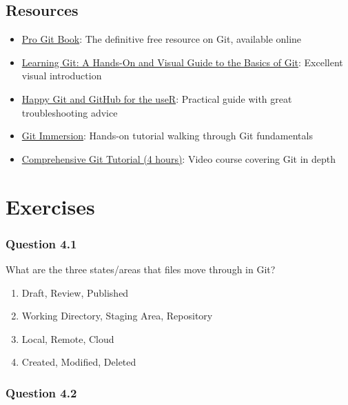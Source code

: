 \documentclass[
  letterpaper,
  DIV=11,
  numbers=noendperiod]{scrreprt}
\providecommand{\tightlist}{%
  \setlength{\itemsep}{0pt}\setlength{\parskip}{0pt}}
\begin{document}
\section{Resources}\label{resources}

\begin{itemize}
\tightlist
\item
  \href{https://git-scm.com/book/en/v2}{Pro Git Book}: The definitive
  free resource on Git, available online
\item
  \href{https://www.amazon.com/Learning-Git-Hands-Visual-Basics/dp/1098133919}{Learning
  Git: A Hands-On and Visual Guide to the Basics of Git}: Excellent
  visual introduction
\item
  \href{https://happygitwithr.com/}{Happy Git and GitHub for the useR}:
  Practical guide with great troubleshooting advice
\item
  \href{https://gitimmersion.com/}{Git Immersion}: Hands-on tutorial
  walking through Git fundamentals
\item
  \href{https://www.youtube.com/watch?v=rH3zE7VlIMs}{Comprehensive Git
  Tutorial (4 hours)}: Video course covering Git in depth
\end{itemize}

\chapter{Exercises}\label{exercises-3}

\subsection{Question 4.1}\label{question-4.1}

What are the three states/areas that files move through in Git?

\begin{enumerate}
\def\labelenumi{\Alph{enumi})}
\tightlist
\item
  Draft, Review, Published\\
\item
  Working Directory, Staging Area, Repository\\
\item
  Local, Remote, Cloud\\
\item
  Created, Modified, Deleted
\end{enumerate}

\subsection{Question 4.2}\label{question-4.2}
\end{document}
